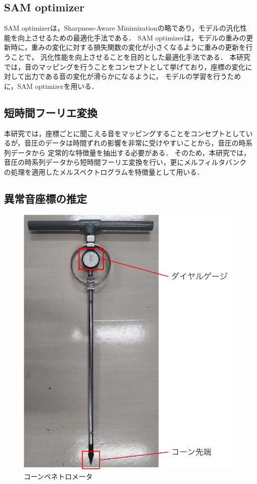 \documentclass[../main]{subfiles}
\begin{document}
\subsection{SAM optimizer}
SAM optimizerは，Sharpness-Aware Minimizationの略であり，モデルの汎化性能を向上させるための最適化手法である．
SAM optimizerは，モデルの重みの更新時に，重みの変化に対する損失関数の変化が小さくなるように重みの更新を行うことで，
汎化性能を向上させることを目的とした最適化手法である．
本研究では，音のマッピングを行うことをコンセプトとして挙げており，座標の変化に対して出力である音の変化が滑らかになるように，
モデルの学習を行うために，SAM optimizerを用いる．
\subsection{短時間フーリエ変換}
本研究では，座標ごとに聞こえる音をマッピングすることをコンセプトとしているが，音圧のデータは時間ずれの影響を非常に受けやすいことから，音圧の時系列データから
定常的な特徴量を抽出する必要がある．
そのため，本研究では，音圧の時系列データから短時間フーリエ変換を行い，更にメルフィルタバンクの処理を適用したメルスペクトログラムを特徴量として用いる．
\subsection{異常音座標の推定}

\begin{figure}[t]
  \centering
  \includegraphics[keepaspectratio, width=0.5\linewidth]{cone_penetrometer.pdf}
  \caption{コーンペネトロメータ}
\end{figure}
\end{document}
